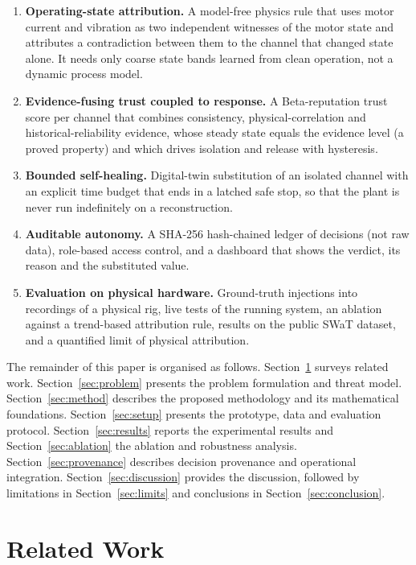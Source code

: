 \documentclass[11pt,a4paper]{article}
\begin{document}
\begin{enumerate}
  \item \textbf{Operating-state attribution.} A model-free physics rule that uses motor current and vibration as two independent witnesses of the motor state and attributes a contradiction between them to the channel that changed state alone. It needs only coarse state bands learned from clean operation, not a dynamic process model.
  \item \textbf{Evidence-fusing trust coupled to response.} A Beta-reputation trust score per channel that combines consistency, physical-correlation and historical-reliability evidence, whose steady state equals the evidence level (a proved property) and which drives isolation and release with hysteresis.
  \item \textbf{Bounded self-healing.} Digital-twin substitution of an isolated channel with an explicit time budget that ends in a latched safe stop, so that the plant is never run indefinitely on a reconstruction.
  \item \textbf{Auditable autonomy.} A SHA-256 hash-chained ledger of decisions (not raw data), role-based access control, and a dashboard that shows the verdict, its reason and the substituted value.
  \item \textbf{Evaluation on physical hardware.} Ground-truth injections into recordings of a physical rig, live tests of the running system, an ablation against a trend-based attribution rule, results on the public SWaT dataset, and a quantified limit of physical attribution.
\end{enumerate}

The remainder of this paper is organised as follows. Section~\ref{sec:related} surveys related work. Section~\ref{sec:problem} presents the problem formulation and threat model. Section~\ref{sec:method} describes the proposed methodology and its mathematical foundations. Section~\ref{sec:setup} presents the prototype, data and evaluation protocol. Section~\ref{sec:results} reports the experimental results and Section~\ref{sec:ablation} the ablation and robustness analysis. Section~\ref{sec:provenance} describes decision provenance and operational integration. Section~\ref{sec:discussion} provides the discussion, followed by limitations in Section~\ref{sec:limits} and conclusions in Section~\ref{sec:conclusion}.

\section{Related Work}
\label{sec:related}
\end{document}
